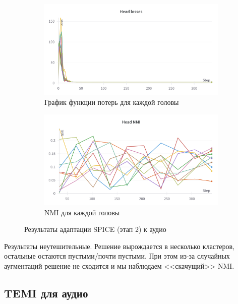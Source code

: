 \documentclass[a4paper,12pt]{extarticle}
\begin{document}
\begin{figure}[ht]
	\centering
    \begin{subfigure}{.5\textwidth}
    \centering
        \includegraphics[width=1.0\textwidth]{spice_head_losses.png}
        \caption{График функции потерь для каждой головы}
    \end{subfigure}%
    \begin{subfigure}{.5\textwidth}
    \centering
        \includegraphics[width=1.0\textwidth]{spice_head_nmi.png}
        \caption{NMI для каждой головы}
    \end{subfigure}
	\caption{Результаты адаптации SPICE (этап 2) к аудио}
	\label{fig:spice_a_graphs}
\end{figure}

    Результаты неутешительные. Решение вырождается в 
    несколько кластеров, остальные остаются пустыми/почти пустыми.
    При этом из-за случайных аугментаций решение не сходится и мы 
    наблюдаем <<скачущий>> NMI.


\subsection{TEMI для аудио}
\end{document}
